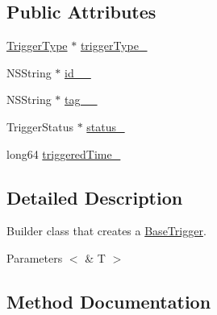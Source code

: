 \subsection*{Public Attributes}
\begin{DoxyCompactItemize}
\item 
\hyperlink{interface_trigger_type}{Trigger\+Type} $\ast$ \hyperlink{interface_base_trigger___base_trigger_builder_a875cc74df90c6b327dac3c98c4f2d238}{trigger\+Type\+\_\+}
\item 
N\+S\+String $\ast$ \hyperlink{interface_base_trigger___base_trigger_builder_a8aa6c4dbe6c24d10bfbc9ef0bca48767}{id\+\_\+\+\_\+}
\item 
N\+S\+String $\ast$ \hyperlink{interface_base_trigger___base_trigger_builder_abdba7bb1d617279f0e09ce2aa14b3056}{tag\+\_\+\+\_\+}
\item 
Trigger\+Status $\ast$ \hyperlink{interface_base_trigger___base_trigger_builder_a88b7844c8302e07ec50dd8f44d5fbc2e}{status\+\_\+}
\item 
long64 \hyperlink{interface_base_trigger___base_trigger_builder_ab271854f368e34c4bb80c20292e9fea4}{triggered\+Time\+\_\+}
\end{DoxyCompactItemize}


\subsection{Detailed Description}
Builder class that creates a \hyperlink{interface_base_trigger}{Base\+Trigger}. 


\begin{DoxyParams}{Parameters}
{\em $<$} & T $>$ \\
\hline
\end{DoxyParams}


\subsection{Method Documentation}
\hypertarget{interface_base_trigger___base_trigger_builder_a32dfc9a198490bbe51285deff75c1fdd}{}

